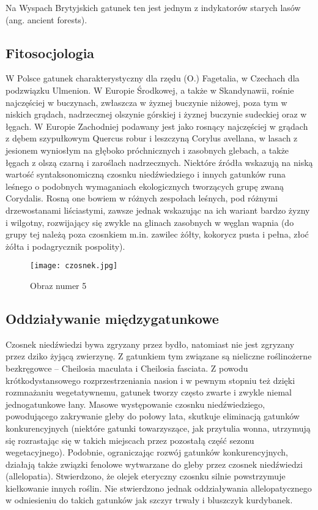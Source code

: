 Na Wyspach Brytyjskich gatunek ten jest jednym z indykatorów starych lasów (ang. ancient forests).

\subsection{Fitosocjologia}
W Polsce gatunek charakterystyczny dla rzędu (O.) Fagetalia, w Czechach dla podzwiązku Ulmenion. W Europie Środkowej, a także w Skandynawii, rośnie najczęściej w buczynach, zwłaszcza w żyznej buczynie niżowej, poza tym w niskich grądach, nadrzecznej olszynie górskiej i żyznej buczynie sudeckiej oraz w łęgach. W Europie Zachodniej podawany jest jako rosnący najczęściej w grądach z dębem szypułkowym Quercus robur i leszczyną Corylus avellana, w lasach z jesionem wyniosłym na głęboko próchnicznych i zasobnych glebach, a także łęgach z olszą czarną i zaroślach nadrzecznych. Niektóre źródła wskazują na niską wartość syntaksonomiczną czosnku niedźwiedziego i innych gatunków runa leśnego o podobnych wymaganiach ekologicznych tworzących grupę zwaną Corydalis. Rosną one bowiem w różnych zespołach leśnych, pod różnymi drzewostanami liściastymi, zawsze jednak wskazując na ich wariant bardzo żyzny i wilgotny, rozwijający się zwykle na glinach zasobnych w węglan wapnia (do grupy tej należą poza czosnkiem m.in. zawilec żółty, kokorycz pusta i pełna, złoć żółta i podagrycznik pospolity).

\begin{figure}
 \centering
 \texttt{[image: czosnek.jpg]}
 \caption{Obraz numer 5}
 \label{figure:example6}
\end{figure}

\subsection{Oddziaływanie międzygatunkowe}
Czosnek niedźwiedzi bywa zgryzany przez bydło, natomiast nie jest zgryzany przez dziko żyjącą zwierzynę. Z gatunkiem tym związane są nieliczne roślinożerne bezkręgowce – Cheilosia maculata i Cheilosia fasciata. Z powodu krótkodystansowego rozprzestrzeniania nasion i w pewnym stopniu też dzięki rozmnażaniu wegetatywnemu, gatunek tworzy często zwarte i zwykle niemal jednogatunkowe łany. Masowe występowanie czosnku niedźwiedziego, powodującego zakrywanie gleby do połowy lata, skutkuje eliminacją gatunków konkurencyjnych (niektóre gatunki towarzyszące, jak przytulia wonna, utrzymują się rozrastając się w takich miejscach przez pozostałą część sezonu wegetacyjnego). Podobnie, ograniczając rozwój gatunków konkurencyjnych, działają także związki fenolowe wytwarzane do gleby przez czosnek niedźwiedzi (allelopatia). Stwierdzono, że olejek eteryczny czosnku silnie powstrzymuje kiełkowanie innych roślin. Nie stwierdzono jednak oddziaływania allelopatycznego w odniesieniu do takich gatunków jak szczyr trwały i bluszczyk kurdybanek.

